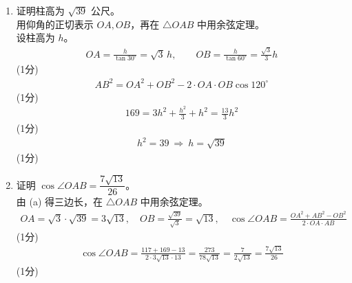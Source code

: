 \begin{solution}
    \begin{enumerate}[label=(\alph*)]
        \item 证明柱高为 $\sqrt{39}$ 公尺。\\
        用仰角的正切表示 $OA,OB$，再在 $\triangle OAB$ 中用余弦定理。\\
        设柱高为 $h$。\\
        \begin{align*}
            OA=\frac{h}{\tan30^\circ}=\sqrt3\,h,\qquad OB=\frac{h}{\tan60^\circ}=\frac{\sqrt3}{3}h
        \end{align*}
        \hfill (1分) \\
        \begin{align*}
            AB^2=OA^2+OB^2-2\cdot OA\cdot OB\cos120^\circ
        \end{align*}
        \hfill (1分) \\
        \begin{align*}
            169=3h^2+\frac{h^2}{3}+h^2=\frac{13}{3}h^2
        \end{align*}
        \hfill (1分) \\
        \begin{align*}
            h^2=39\ \Rightarrow\ h=\sqrt{39}
        \end{align*}
        \hfill (1分)

        \item 证明 $\cos\angle OAB=\dfrac{7\sqrt{13}}{26}$。\\
        由 (a) 得三边长，在 $\triangle OAB$ 中用余弦定理。\\
        \begin{align*}
            OA=\sqrt3\cdot\sqrt{39}=3\sqrt{13},\quad OB=\frac{\sqrt{39}}{\sqrt3}=\sqrt{13},\quad
            \cos\angle OAB=\frac{OA^2+AB^2-OB^2}{2\cdot OA\cdot AB}
        \end{align*}
        \hfill (1分) \\
        \begin{align*}
            \cos\angle OAB=\frac{117+169-13}{2\cdot3\sqrt{13}\cdot13}
            =\frac{273}{78\sqrt{13}}=\frac{7}{2\sqrt{13}}=\frac{7\sqrt{13}}{26}
        \end{align*}
        \hfill (1分)


\end{enumerate}
\end{solution}
